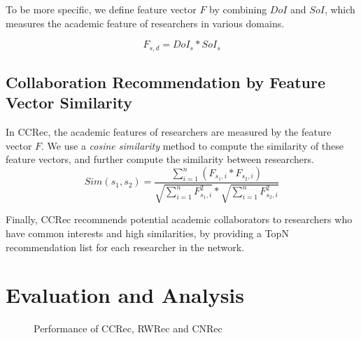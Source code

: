 \documentclass{acm_proc_article-sp}
\begin{document}
To be more specific, we define feature vector $F$ by combining $DoI$ and $SoI$, which measures the academic feature of researchers in various domains.

\begin{equation}
F_{s,d}=DoI_{s}*SoI_{s}
\end{equation}

\subsection{Collaboration Recommendation by Feature Vector Similarity}
In CCRec, the academic features of researchers are measured by the feature vector $F$. We use a \emph{cosine similarity} method to compute the similarity of these feature vectors, and further compute the similarity between researchers.
\begin{equation}
Sim(s_{1},s_{2})=\frac{\sum_{i=1}^{n}(F_{s_{1},i}*F_{s_{2},i})}{\sqrt{\sum_{i=1}^{n}F_{s_{1},i}^2}*\sqrt{\sum_{i=1}^{n}F_{s_{2},i}^2}}
\end{equation}

Finally, CCRec recommends potential academic collaborators to researchers who have common interests and high similarities, by providing a TopN recommendation list for each researcher in the network.

\section{Evaluation and Analysis}
\begin{figure}
\centering
{}
\caption{Performance of CCRec, RWRec and CNRec}
\label{fig:5}       %
\end{figure}
\end{document}
